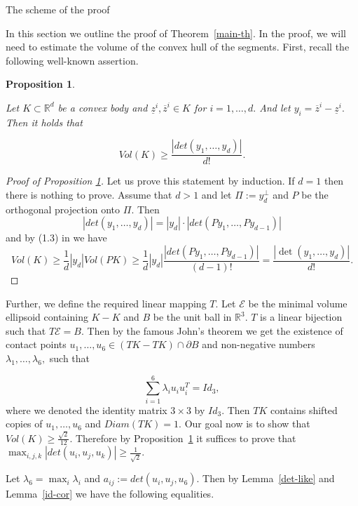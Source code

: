 \documentclass[12pt]{article}
\newtheorem{proposition}{Proposition}[section]
\begin{document}
\begin{section}{The scheme of the proof}

  In this section we outline the proof of Theorem~\ref{main-th}. In the proof, we will need to estimate the volume of the convex hull of the segments. First, recall the following well-known assertion.

\begin{proposition} 
    \label{app}
    
    Let $K\subset \mathbb{R}^{d}$ be a convex body and $\underline{z}^{i},\overline{z}^{i}\in K$ for $i =1,\ldots,d.$ And let $y_{i} = \overline{z}^{i}-\underline{z}^{i}.$ Then it holds that

    $$
        Vol(K)\geq \frac{|det(y_{1},\ldots,y_{d})|}{d!}.
    $$
        
    \end{proposition}

    \begin{proof}[Proof of Proposition \ref{app}]
        Let us prove this statement by induction. If $d=1$ then there is nothing to prove. Assume that $d>1$ and let $\Pi := y_{d}^{\perp}$ and $P$ be the orthogonal projection onto $\Pi$. Then $$|det(y_{1},\ldots,y_{d})| = |y_{d}|\cdot|det(Py_{1},\ldots,Py_{d-1})|$$ and by (1.3) in \cite{zhang} we have 
        $$
            Vol(K)\geq \frac{1}{d}|y_{d}|Vol(PK) \geq \frac{1}{d}|y_{d}|\frac{|det(Py_{1},\ldots,Py_{d-1})|}{(d-1)!} = \frac{|\det(y_{1},\ldots,y_{d})|}{d!}.
        $$
    
    \end{proof}

        Further, we define the required linear mapping $T$. Let $\mathcal{E}$ be the minimal volume ellipsoid containing $K-K$  and $B$ be the unit ball in $\mathbb{R}^{3}.$ $T$ is a linear bijection such that $T\mathcal{E} = B.$ Then by the famous John's theorem \cite {ball} we get the existence of contact points $u_{1},\ldots,u_{6}\in (TK-TK)\cap \partial B$ and non-negative numbers $\lambda_{1},\ldots,\lambda_{6}, $ such that 

         $$
            \sum_{i=1}^{6}\lambda_{i}u_{i}u_{i}^{T} = Id_{3},
        $$
        where we denoted the identity matrix $3\times 3$ by $Id_{3}$. Then $TK$ contains shifted copies of $u_{1},\ldots,u_{6}$ and $Diam(TK)=1$. Our goal now is to show that $Vol(K)\geq \frac{\sqrt{2}}{12}$. Therefore by Proposition~\ref{app} it suffices to prove that $\max_{i,j,k}|det(u_{i},u_{j},u_{k})|\geq \frac{1}{\sqrt{2}}.$ 

        Let $\lambda_{6} = \max_{i}\lambda_{i}$ and  $a_{ij}:=det(u_{i},u_{j},u_{6}).$ Then by Lemma~\ref{det-like} and Lemma~\ref{id-cor} we have the following equalities. 


\end{section}
\end{document}
